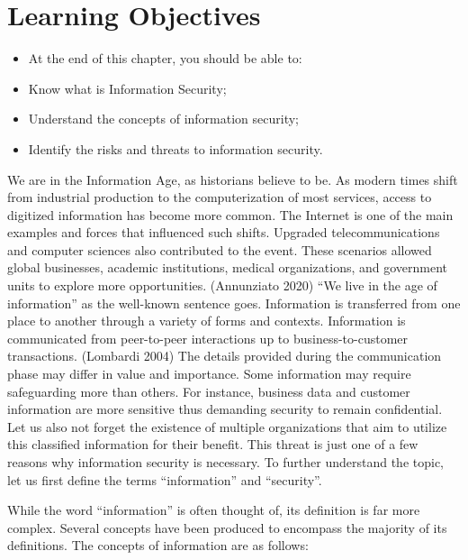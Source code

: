 \documentclass[
  letterpaper,
  DIV=11,
  numbers=noendperiod]{scrreprt}
\providecommand{\tightlist}{%
  \setlength{\itemsep}{0pt}\setlength{\parskip}{0pt}}\usepackage{longtable,booktabs,array}
\begin{document}
\section{Learning Objectives}\label{learning-objectives-1}

\begin{itemize}
\tightlist
\item
  At the end of this chapter, you should be able to:
\item
  Know what is Information Security;
\item
  Understand the concepts of information security;
\item
  Identify the risks and threats to information security.
\end{itemize}

We are in the Information Age, as historians believe to be. As modern
times shift from industrial production to the computerization of most
services, access to digitized information has become more common. The
Internet is one of the main examples and forces that influenced such
shifts. Upgraded telecommunications and computer sciences also
contributed to the event. These scenarios allowed global businesses,
academic institutions, medical organizations, and government units to
explore more opportunities. (Annunziato 2020) ``We live in the age of
information'' as the well-known sentence goes. Information is
transferred from one place to another through a variety of forms and
contexts. Information is communicated from peer-to-peer interactions up
to business-to-customer transactions. (Lombardi 2004) The details
provided during the communication phase may differ in value and
importance. Some information may require safeguarding more than others.
For instance, business data and customer information are more sensitive
thus demanding security to remain confidential. Let us also not forget
the existence of multiple organizations that aim to utilize this
classified information for their benefit. This threat is just one of a
few reasons why information security is necessary. To further understand
the topic, let us first define the terms ``information'' and
``security''.

While the word ``information'' is often thought of, its definition is
far more complex. Several concepts have been produced to encompass the
majority of its definitions. The concepts of information are as follows:
\end{document}
